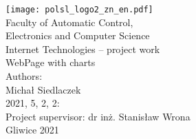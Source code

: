 
\thispagestyle{empty}

\begin{titlepage}
{\centering
{}
\null
\vspace{-1.0in}
\texttt{[image: polsl\_logo2\_zn\_en.pdf]}\\[2.5em]
\normalfont\LARGE
Faculty of Automatic Control, \\Electronics and Computer Science \\[1.3em]
\normalfont\LARGE
Internet Technologies -- project work \\[1.5em]
\UseLMSSBoldFont\LARGE
WebPage with charts\\[5.2em]}
\normalfont\large
\noindent
Authors: 
\\[0.5em]
Michał Siedlaczek
\\[1.5em]
2021, 5, 2, 2: 
\\[0.5em]
Project supervisor: dr inż. Stanisław Wrona
\\[1.5em]

\vfill
\centering Gliwice 2021
\par
\end{titlepage}




\pagestyle{plain}
\setcounter{page}{2}


\clearpage




\tableofcontents



\clearpage
